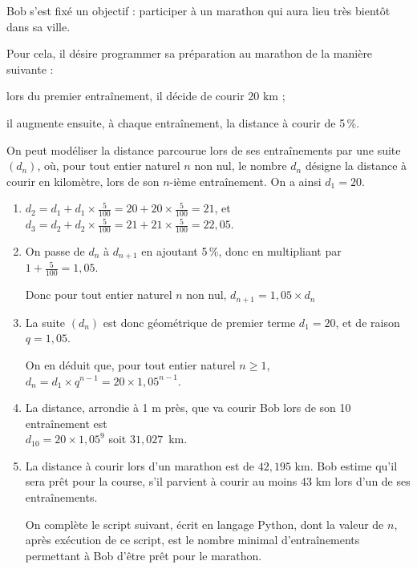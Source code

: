 \bigskip

Bob s'est fixé un objectif : participer à un marathon qui aura lieu très bientôt dans sa ville.

Pour cela, il désire programmer sa préparation au marathon de la manière suivante :

\begin{list}{\textbullet}{}
\item lors du premier entraînement, il décide de courir 20 km ;
\item il augmente ensuite, à chaque entraînement, la distance à courir de 5\,\%.
\end{list}

On peut modéliser la distance parcourue lors de ses entraînements par une suite $(d_n)$, où, pour tout entier naturel $n$ non nul, le nombre $d_n$ désigne la distance à courir en kilomètre, lors de son $n$-ième entraînement.
On a ainsi $d_1 = 20$.

\begin{enumerate}
\item $d_2 = d_1 + d_1\times \frac{5}{100} =  20 + 20\times \frac{5}{100} = 21$, et
$d_3 = d_2 + d_2\times \frac{5}{100} =  21 + 21\times \frac{5}{100} = 22,05$.

\item 
On passe de $d_n$ à $d_{n+1}$ en ajoutant 5\,\%, donc en multipliant par $1+\frac{5}{100}=1,05$. 

Donc pour tout entier naturel $n$ non nul,  $d_{n+1}= 1,05\times d_n$ 

\item La suite $(d_n)$ est donc géométrique de premier terme $d_1=20$, et de raison $q=1,05$.

 On en déduit que, pour tout entier naturel $n \geqslant 1$, $d_n= d_1\times q^{n-1} = 20\times 1,05^{n-1}$.

\item La distance, arrondie à 1 m près, que va courir Bob lors de son 10\ieme{} entraînement est\\
$d_{10} = 20\times 1,05^{9}$ soit $31,027$~km.

\item La distance à courir lors d'un marathon est de $42,195$ km. Bob estime qu'il sera prêt pour la course, s'il parvient à courir au moins 43 km lors d'un de ses entraînements.

On complète le script suivant, écrit en langage Python, dont la valeur de $n$, après exécution de ce script, est le nombre minimal d'entraînements permettant à Bob d'être prêt pour le marathon.

\begin{center}
\end{center}

\end{enumerate}
